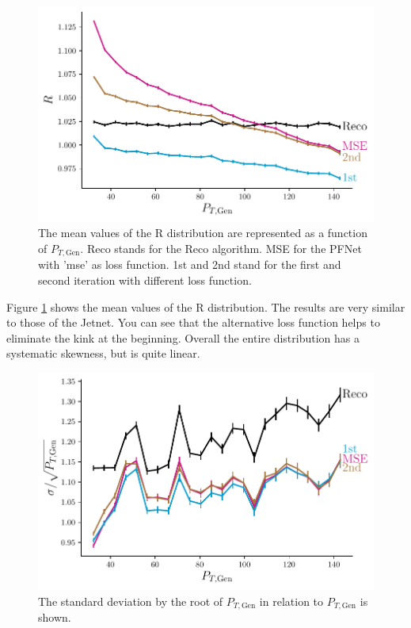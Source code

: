 \documentclass[12pt, a4paper]{thesis}
\begin{document}
\begin{figure}[H]
  \centering
  \includegraphics[width=.9\linewidth]{../images/pfnet_R.pdf}
  \caption{The mean values of the R distribution are represented as a
    function of \(P_{T, \text{Gen}}\). Reco stands for the Reco
    algorithm. MSE for the PFNet with 'mse' as loss function. 1st and
    2nd stand for the first and second iteration with different loss
    function.}
  \label{pfnet_R}
\end{figure}

Figure \ref{pfnet_R} shows the mean values of the R
distribution. The results are very similar to those of the Jetnet. You
can see that the alternative loss function helps to eliminate the kink
at the beginning.  Overall the entire distribution has a systematic
skewness, but is quite linear.

\begin{figure}[H]
  \centering
  \includegraphics[width=.9\linewidth]{../images/pfnet_res.pdf}
  \caption{The standard deviation by the root of \(P_{T, \text{Gen}}\)
    in relation to \(P_{T, \text{Gen}}\) is shown.}
  \label{pfnet_res}
\end{figure} 
\end{document}
